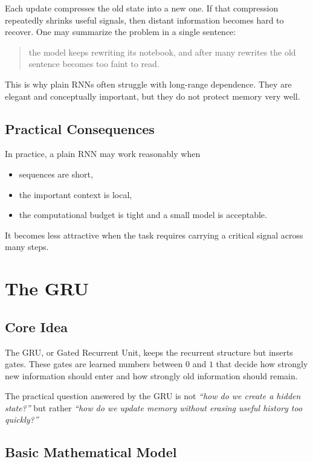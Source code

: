 \documentclass[12pt,a4paper]{article}
\begin{document}
Each update compresses the old state into a new one. If that compression repeatedly shrinks useful signals, then distant information becomes hard to recover. One may summarize the problem in a single sentence:
\begin{quote}
the model keeps rewriting its notebook, and after many rewrites the old sentence becomes too faint to read.
\end{quote}

This is why plain RNNs often struggle with long-range dependence. They are elegant and conceptually important, but they do not protect memory very well.

\subsection{Practical Consequences}

In practice, a plain RNN may work reasonably when
\begin{itemize}
  \item sequences are short,
  \item the important context is local,
  \item the computational budget is tight and a small model is acceptable.
\end{itemize}

It becomes less attractive when the task requires carrying a critical signal across many steps.

\section{The GRU}

\subsection{Core Idea}

The GRU, or Gated Recurrent Unit, keeps the recurrent structure but inserts gates. These gates are learned numbers between \(0\) and \(1\) that decide how strongly new information should enter and how strongly old information should remain.

The practical question answered by the GRU is not
\emph{``how do we create a hidden state?''}
but rather
\emph{``how do we update memory without erasing useful history too quickly?''}

\subsection{Basic Mathematical Model}
\end{document}
